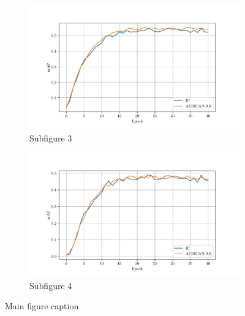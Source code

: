 \begin{figure}
\begin{adjustwidth}{-0.2\linewidth}{-0.07\linewidth}
    \vspace{10pt} %

    \begin{subfigure}[b]{0.7\textwidth}
        \includegraphics[width=\textwidth]{assets/charts/4_4_finalscore_0_overall.pdf}
        \caption{Subfigure 3}
        \label{fig:subfig3}
    \end{subfigure}
    \begin{subfigure}[b]{0.7\textwidth}
        \includegraphics[width=\textwidth]{assets/charts/4_4_finalscore_3_tail.pdf}
        \caption{Subfigure 4}
        \label{fig:subfig4}
    \end{subfigure}
    
    \caption{Main figure caption}
    \label{fig:main}
    
\end{adjustwidth}
\end{figure}


    
